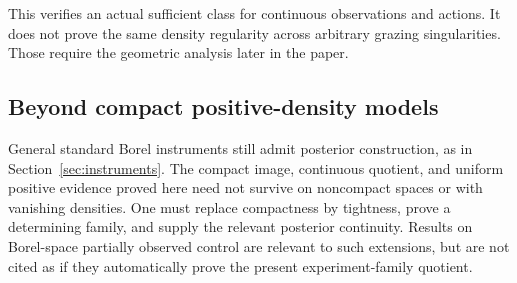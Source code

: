 This verifies an actual sufficient class for continuous observations and actions. It does not prove the same density regularity across arbitrary grazing singularities. Those require the geometric analysis later in the paper.

\subsection{Beyond compact positive-density models}
General standard Borel instruments still admit posterior construction, as in Section~\ref{sec:instruments}. The compact image, continuous quotient, and uniform positive evidence proved here need not survive on noncompact spaces or with vanishing densities. One must replace compactness by tightness, prove a determining family, and supply the relevant posterior continuity. Results on Borel-space partially observed control \cite{FeinbergEtAl} are relevant to such extensions, but are not cited as if they automatically prove the present experiment-family quotient.
\par

